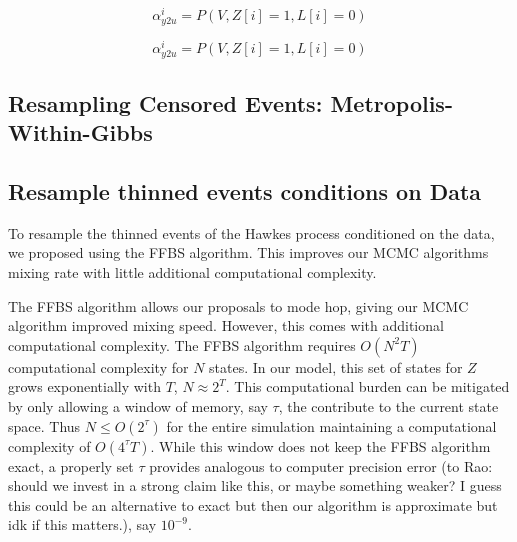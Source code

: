 \documentclass[11pt]{article}
\newcommand{\algrule}[1][.2pt]{\par\vskip.5\baselineskip\hrule height #1\par\vskip.5\baselineskip}
\begin{document}

\[
  \alpha_{y2u}^i
  =
  P(V,Z[i] = 1, L[i] = 0)
\]


\[
  \alpha_{y2u}^i
  =
  P(V,Z[i] = 1, L[i] = 0)
\]

\subsection{Resampling Censored Events: Metropolis-Within-Gibbs}


\subsection{Resample thinned events conditions on Data}

To resample the thinned events of the Hawkes process conditioned on the data, we proposed using the FFBS algorithm. This improves our MCMC algorithms mixing rate with little additional computational complexity.



The FFBS algorithm allows our proposals to mode hop, giving our MCMC algorithm improved mixing speed. However, this comes with additional computational complexity. The FFBS algorithm requires $O(N^2T)$ computational complexity for $N$ states. In our model, this set of states for $Z$ grows exponentially with $T$, $N \approx 2^T$. This computational burden can be mitigated by only allowing a window of memory, say $\tau$, the contribute to the current state space. Thus $N \leq O(2^\tau)$ for the entire simulation maintaining a computational complexity of $O(4^{\tau} T)$. While this window does not keep the FFBS algorithm exact, a properly set $\tau$ provides analogous to computer precision error (to Rao: should we invest in a strong claim like this, or maybe something weaker? I guess this could be an alternative to exact but then our algorithm is approximate but idk if this matters.), say $10^{-9}$.
\end{document}
